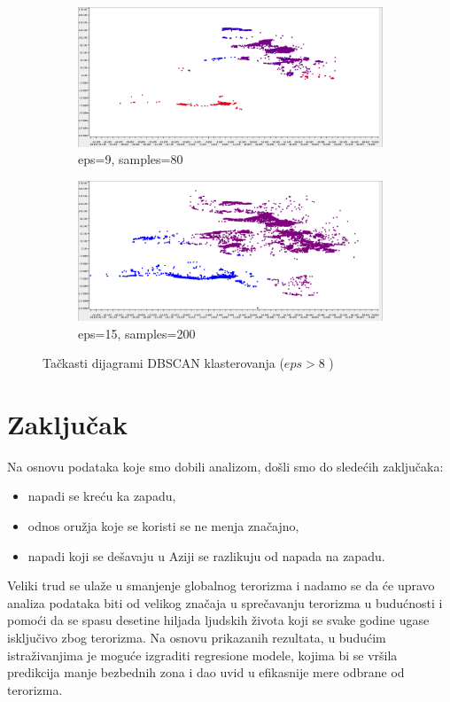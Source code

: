 \documentclass[a4paper]{article}
\begin{document}
\begin{figure}
\centering  
\begin{subfigure}[h!]{\textwidth}
	\includegraphics[width=\textwidth]{09_080.png}
	\caption{eps=9, samples=80}
\end{subfigure} 
\begin{subfigure}[h!]{\textwidth}
	\includegraphics[width=\textwidth]{15_200.png}
	\caption{eps=15, samples=200}
\end{subfigure} 
\caption{Tačkasti dijagrami DBSCAN klasterovanja ($eps > 8$ )}
\label{fig:epsvece}
\end{figure} 


\newpage
\section{Zaključak}
\label{sec:zakljucak}
Na osnovu podataka koje smo dobili analizom, došli smo do sledećih zaključaka:
\begin{itemize}
	\item napadi se kreću ka zapadu,
	\item odnos oružja koje se koristi se ne menja značajno,
	\item napadi koji se dešavaju u Aziji se razlikuju od napada na zapadu.
\end{itemize}
Veliki trud se ulaže u smanjenje globalnog terorizma i nadamo se da će upravo analiza podataka biti od velikog značaja u sprečavanju terorizma u budućnosti i pomoći da se spasu desetine hiljada ljudskih života koji se svake godine ugase isključivo zbog terorizma. Na osnovu prikazanih rezultata, u budućim istraživanjima je moguće izgraditi regresione modele, kojima bi se vršila predikcija manje bezbednih zona i dao uvid u efikasnije mere odbrane od terorizma. 
\end{document}
